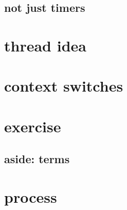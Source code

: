 \subsection{not just timers}




\section{thread idea}


\section{context switches} 



\section{exercise}


\subsection{aside: terms}



\section{process}





